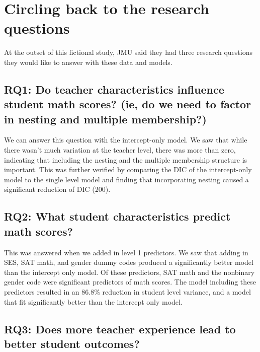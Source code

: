\documentclass[
]{book}
\begin{document}
\hypertarget{circling-back-to-the-research-questions}{%
\section{Circling back to the research questions}\label{circling-back-to-the-research-questions}}

At the outset of this fictional study, JMU said they had three research questions they would like to answer with these data and models.

\hypertarget{rq1-do-teacher-characteristics-influence-student-math-scores-ie-do-we-need-to-factor-in-nesting-and-multiple-membership}{%
\subsection{RQ1: Do teacher characteristics influence student math scores? (ie, do we need to factor in nesting and multiple membership?)}\label{rq1-do-teacher-characteristics-influence-student-math-scores-ie-do-we-need-to-factor-in-nesting-and-multiple-membership}}

We can answer this question with the intercept-only model. We saw that while there wasn't much variation at the teacher level, there was more than zero, indicating that including the nesting and the multiple membership structure is important. This was further verified by comparing the DIC of the intercept-only model to the single level model and finding that incorporating nesting caused a significant reduction of DIC (200).

\hypertarget{rq2-what-student-characteristics-predict-math-scores}{%
\subsection{RQ2: What student characteristics predict math scores?}\label{rq2-what-student-characteristics-predict-math-scores}}

This was answered when we added in level 1 predictors. We saw that adding in SES, SAT math, and gender dummy codes produced a significantly better model than the intercept only model. Of these predictors, SAT math and the nonbinary gender code were significant predictors of math scores. The model including these predictors resulted in an 86.8\% reduction in student level variance, and a model that fit significantly better than the intercept only model.

\hypertarget{rq3-does-more-teacher-experience-lead-to-better-student-outcomes}{%
\subsection{RQ3: Does more teacher experience lead to better student outcomes?}\label{rq3-does-more-teacher-experience-lead-to-better-student-outcomes}}
\end{document}
